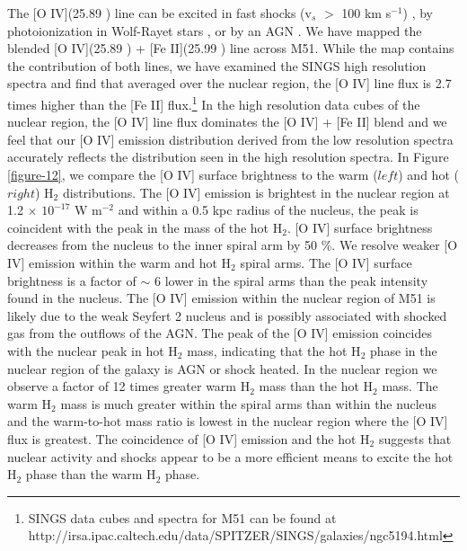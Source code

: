\documentclass[12pt,preprint]{aastex}
\begin{document}
The [O IV](25.89 \micron) line can be excited in fast shocks 
(v$_s$ $>$ 100 km s$^{-1}$) \citep{lutz98},
by photoionization in Wolf-Rayet stars \citep{ss99}, or by an
AGN \citep{smi04}.  We have mapped the blended 
[O IV](25.89 \micron) + [Fe II](25.99 \micron) line across M51.  
While the map contains the contribution of both lines, we have examined the SINGS 
high resolution spectra and find that averaged over the nuclear region, the [O IV] line flux is 2.7 times 
higher than the [Fe II] flux.\footnote{SINGS data cubes and spectra for M51 can be found at 
http://irsa.ipac.caltech.edu/data/SPITZER/SINGS/galaxies/ngc5194.html} 
In the high resolution data cubes of the nuclear region, 
the [O IV] line flux dominates the [O IV] + [Fe II] blend and we feel that our [O IV] 
emission distribution derived from the low resolution spectra accurately reflects 
the distribution seen in the high resolution spectra.
In Figure \ref{figure-12}, we compare 
the [O IV] surface brightness to the warm ($left$) and hot ($right$) H$_2$ distributions.  
The [O IV] emission is brightest in the nuclear region at 1.2 $\times$
$\mathrm{10^{-17}}$ W $\mathrm{m^{-2}}$ and within a 0.5 kpc radius of the nucleus, the peak is coincident with the peak in the mass of the hot H$_2$.  [O IV]
surface brightness decreases from the nucleus to the inner spiral arm by 50 \%.
We resolve weaker [O IV] emission within the warm and hot
H$_2$ spiral arms.  The [O IV] surface brightness
is a factor of $\sim$ 6 lower in the spiral arms than the peak
intensity found in the nucleus.  The [O IV] emission within the nuclear 
region of M51 is likely due to the weak Seyfert 2 nucleus \citep{ford85} 
and is possibly associated with shocked gas from the outflows of the AGN.  
The peak of the [O IV] emission coincides with the nuclear peak in hot 
H$_2$ mass, indicating that the hot H$_2$ phase in the 
nuclear region of the galaxy is AGN or shock heated. 
In the nuclear region we observe a factor of 12 times greater
warm H$_2$ mass than the hot H$_2$ mass.  
The warm H$_2$ mass is much
greater within the spiral arms than within the nucleus and the
warm-to-hot mass ratio is lowest in the nuclear region where 
the [O IV] flux is greatest.  The coincidence of [O IV] emission 
and the hot H$_2$ suggests that nuclear activity and shocks 
appear to be a more efficient means to excite the hot H$_2$ 
phase than the warm H$_2$ phase.
\end{document}
